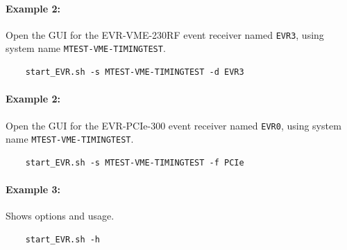 \documentclass[12pt,a4paper]{article}
\begin{document}
\paragraph{Example 2:} Open the GUI for the EVR-VME-230RF event receiver named \texttt{EVR3}, using system name \texttt{MTEST-VME-TIMINGTEST}.
\begin{verbatim}
	start_EVR.sh -s MTEST-VME-TIMINGTEST -d EVR3
\end{verbatim}

\paragraph{Example 2:} Open the GUI for the EVR-PCIe-300 event receiver named \texttt{EVR0}, using system name \texttt{MTEST-VME-TIMINGTEST}.
\begin{verbatim}
	start_EVR.sh -s MTEST-VME-TIMINGTEST -f PCIe
\end{verbatim}

\paragraph{Example 3:} Shows options and usage.
\begin{verbatim}
	start_EVR.sh -h
\end{verbatim}



\end{document}
